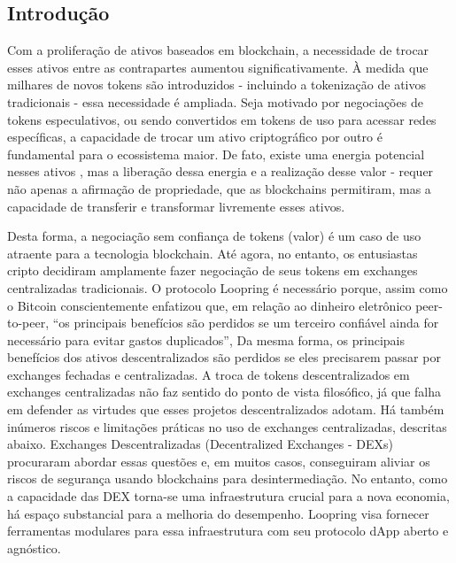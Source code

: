 \documentclass[UTF8,nofonts]{article}
\begin{document}
\begin{multicols}{2}
\section{Introdução\label{sec:introduction}}

Com a proliferação de ativos baseados em blockchain, a necessidade de trocar esses ativos entre as contrapartes aumentou significativamente. À medida que milhares de novos tokens são introduzidos - incluindo a tokenização de ativos tradicionais - essa necessidade é ampliada. Seja motivado por negociações de tokens especulativos, ou sendo convertidos em tokens de uso para acessar redes específicas, a capacidade de trocar um ativo criptográfico por outro é fundamental para o ecossistema maior. De fato, existe uma energia potencial nesses ativos \cite{desotocapital}, mas a liberação dessa energia e a realização desse valor - requer não apenas a afirmação de propriedade, que as blockchains permitiram, mas a capacidade de transferir e transformar livremente esses ativos.
 
Desta forma, a negociação sem confiança de tokens (valor) é um caso de uso atraente para a tecnologia blockchain. 
Até agora, no entanto, os entusiastas cripto decidiram amplamente fazer negociação de seus tokens em exchanges centralizadas tradicionais. O protocolo Loopring é necessário porque, assim como o Bitcoin \cite{nakamoto2008bitcoin} conscientemente enfatizou que, em relação ao dinheiro eletrônico peer-to-peer, \enquote{os principais benefícios são perdidos se um terceiro confiável ainda for necessário para evitar gastos duplicados}, Da mesma forma, os principais benefícios dos ativos descentralizados são perdidos se eles precisarem passar por exchanges fechadas e centralizadas. 
A troca de tokens descentralizados em exchanges centralizadas não faz sentido do ponto de vista filosófico, já que falha em defender as virtudes que esses projetos descentralizados adotam. Há também inúmeros riscos e limitações práticas no uso de exchanges centralizadas, descritas abaixo. Exchanges Descentralizadas (Decentralized Exchanges - DEXs) \cite{schuh2015bitshares} \cite{bancor} \cite{kyber} procuraram abordar essas questões e, em muitos casos, conseguiram aliviar os riscos de segurança usando blockchains para desintermediação. No entanto, como a capacidade das DEX torna-se uma infraestrutura crucial para a nova economia, há espaço substancial para a melhoria do desempenho. Loopring visa fornecer ferramentas modulares para essa infraestrutura com seu protocolo dApp aberto e agnóstico.


\end{multicols}
\end{document}

